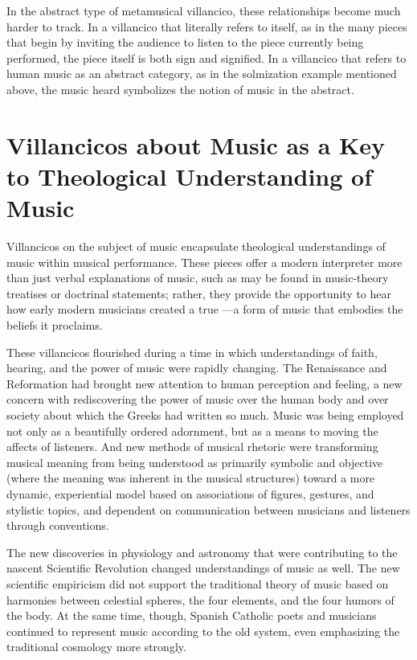 In the abstract type of metamusical villancico, these relationships become much harder to track.
In a villancico that literally refers to itself, as in the many pieces that begin by inviting the audience to listen to the piece currently being performed, the piece itself is both sign and signified.
In a villancico that refers to human music as an abstract category, as in the solmization example mentioned above, the music heard symbolizes the notion of music in the abstract.





\section{%
Villancicos about Music as a Key to Theological Understanding of Music
}

Villancicos on the subject of music encapsulate theological understandings of music within musical performance.
These pieces offer a modern interpreter more than just verbal explanations of music, such as may be found in music-theory treatises or doctrinal statements; rather, they provide the opportunity to hear how early modern musicians created a true ---a form of music that embodies the beliefs it proclaims.

These villancicos flourished during a time in which understandings of faith, hearing, and the power of music were rapidly changing.
The Renaissance and Reformation had brought new attention to human perception and feeling, a new concern with rediscovering the power of music over the human body and over society about which the Greeks had written so much.
Music was being employed not only as a beautifully ordered adornment, but as a means to moving the affects of listeners.
And new methods of musical rhetoric were transforming musical meaning from being understood as primarily symbolic and objective (where the meaning was inherent in the musical structures) toward a more dynamic, experiential model based on associations of figures, gestures, and stylistic topics, and dependent on communication between musicians and listeners through conventions.

The new discoveries in physiology and astronomy that were contributing to the nascent Scientific Revolution changed understandings of music as well.%
	\autocite{Gouk:Sciences}
The new scientific empiricism did not support the traditional theory of music based on harmonies between celestial spheres, the four elements, and the four humors of the body.
At the same time, though, Spanish Catholic poets and musicians continued to represent music according to the old system, even emphasizing the traditional cosmology more strongly.

